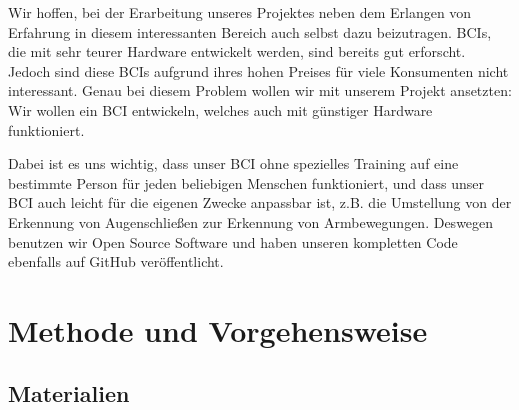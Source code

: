 \documentclass[11pt]{scrartcl}
\begin{document}
	Wir hoffen, bei der Erarbeitung unseres Projektes neben dem Erlangen von Erfahrung in diesem interessanten Bereich auch selbst dazu beizutragen. BCIs, die mit sehr teurer Hardware entwickelt werden, sind bereits gut erforscht. Jedoch sind diese BCIs aufgrund ihres hohen Preises für viele Konsumenten nicht interessant. Genau bei diesem Problem wollen wir mit unserem Projekt ansetzten: Wir wollen ein BCI entwickeln, welches auch mit günstiger Hardware funktioniert.
	
	Dabei ist es uns wichtig, dass unser BCI ohne spezielles Training auf eine bestimmte Person für jeden beliebigen Menschen funktioniert, und dass unser BCI auch leicht für die eigenen Zwecke anpassbar ist, z.B. die Umstellung von der Erkennung von Augenschließen zur Erkennung von Armbewegungen. Deswegen benutzen wir Open Source Software und haben unseren kompletten Code ebenfalls auf GitHub veröffentlicht.

	\section{Methode und Vorgehensweise}

	\subsection{Materialien} \label{Materialien}
\end{document}

